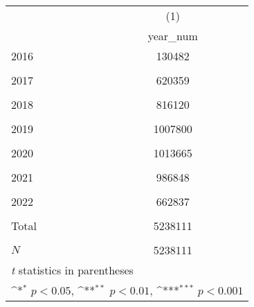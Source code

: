 {
\def\sym#1{\ifmmode^{#1}\else\(^{#1}\)\fi}
\begin{tabular}{l*{1}{c}}
\hline\hline
            &\multicolumn{1}{c}{(1)}\\
            &\multicolumn{1}{c}{year\_num}\\
\hline
2016        &      130482         \\
            &                     \\
2017        &      620359         \\
            &                     \\
2018        &      816120         \\
            &                     \\
2019        &     1007800         \\
            &                     \\
2020        &     1013665         \\
            &                     \\
2021        &      986848         \\
            &                     \\
2022        &      662837         \\
            &                     \\
Total       &     5238111         \\
            &                     \\
\hline
\(N\)       &     5238111         \\
\hline\hline
\multicolumn{2}{l}{\footnotesize \textit{t} statistics in parentheses}\\
\multicolumn{2}{l}{\footnotesize \sym{*} \(p<0.05\), \sym{**} \(p<0.01\), \sym{***} \(p<0.001\)}\\
\end{tabular}
}
